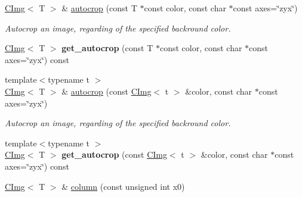 \begin{DoxyCompactItemize}
\item 
\hypertarget{structcimg__library_1_1CImg_af8acc159cf6c641dc8568d7f4ec6b670}{
\hyperlink{structcimg__library_1_1CImg}{CImg}$<$ T $>$ \& \hyperlink{structcimg__library_1_1CImg_af8acc159cf6c641dc8568d7f4ec6b670}{autocrop} (const T $\ast$const color, const char $\ast$const axes=\char`\"{}zyx\char`\"{})}
\label{structcimg__library_1_1CImg_af8acc159cf6c641dc8568d7f4ec6b670}

\begin{DoxyCompactList}\small\item\em Autocrop an image, regarding of the specified backround color. \item\end{DoxyCompactList}\item 
\hypertarget{structcimg__library_1_1CImg_aade5db378c880ea24ca277dbeb3734ae}{
\hyperlink{structcimg__library_1_1CImg}{CImg}$<$ T $>$ {\bfseries get\_\-autocrop} (const T $\ast$const color, const char $\ast$const axes=\char`\"{}zyx\char`\"{}) const }
\label{structcimg__library_1_1CImg_aade5db378c880ea24ca277dbeb3734ae}

\item 
\hypertarget{structcimg__library_1_1CImg_a97f20499568cffa340ab6efc88980fea}{
{\footnotesize template$<$typename t $>$ }\\\hyperlink{structcimg__library_1_1CImg}{CImg}$<$ T $>$ \& \hyperlink{structcimg__library_1_1CImg_a97f20499568cffa340ab6efc88980fea}{autocrop} (const \hyperlink{structcimg__library_1_1CImg}{CImg}$<$ t $>$ \&color, const char $\ast$const axes=\char`\"{}zyx\char`\"{})}
\label{structcimg__library_1_1CImg_a97f20499568cffa340ab6efc88980fea}

\begin{DoxyCompactList}\small\item\em Autocrop an image, regarding of the specified backround color. \item\end{DoxyCompactList}\item 
\hypertarget{structcimg__library_1_1CImg_a7de70deea8cfd093e23b8149a8269691}{
{\footnotesize template$<$typename t $>$ }\\\hyperlink{structcimg__library_1_1CImg}{CImg}$<$ T $>$ {\bfseries get\_\-autocrop} (const \hyperlink{structcimg__library_1_1CImg}{CImg}$<$ t $>$ \&color, const char $\ast$const axes=\char`\"{}zyx\char`\"{}) const }
\label{structcimg__library_1_1CImg_a7de70deea8cfd093e23b8149a8269691}

\item 
\hypertarget{structcimg__library_1_1CImg_a9995a97a1f5bf1de44670dd998f6b19e}{
\hyperlink{structcimg__library_1_1CImg}{CImg}$<$ T $>$ \& \hyperlink{structcimg__library_1_1CImg_a9995a97a1f5bf1de44670dd998f6b19e}{column} (const unsigned int x0)}
\label{structcimg__library_1_1CImg_a9995a97a1f5bf1de44670dd998f6b19e}


\end{DoxyCompactItemize}
